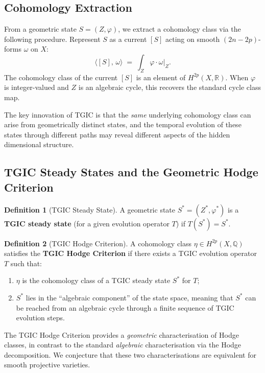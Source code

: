 \documentclass[11pt,a4paper]{article}
\theoremstyle{definition}
\newtheorem{definition}{Definition}[section]
\theoremstyle{plain}
\newcommand{\QQ}{\mathbb{Q}}
\newcommand{\RR}{\mathbb{R}}
\begin{document}
\subsection{Cohomology Extraction}

From a geometric state $S = (Z, \varphi)$, we extract a cohomology class via the following procedure. Represent $S$ as a current $[S]$ acting on smooth $(2n - 2p)$-forms $\omega$ on $X$:
\begin{equation}\label{eq:current}
\langle [S],\, \omega \rangle \;=\; \int_{Z} \varphi \cdot \omega|_{Z}.
\end{equation}
The cohomology class of the current $[S]$ is an element of $H^{2p}(X, \RR)$. When $\varphi$ is integer-valued and $Z$ is an algebraic cycle, this recovers the standard cycle class map.

The key innovation of TGIC is that the \emph{same} underlying cohomology class can arise from geometrically distinct states, and the temporal evolution of these states through different paths may reveal different aspects of the hidden dimensional structure.

\subsection{TGIC Steady States and the Geometric Hodge Criterion}

\begin{definition}[TGIC Steady State]\label{def:steady}
A geometric state $S^* = (Z^*, \varphi^*)$ is a \textbf{TGIC steady state} (for a given evolution operator $T$) if $T(S^*) = S^*$.
\end{definition}

\begin{definition}[TGIC Hodge Criterion]\label{def:hodge-criterion}
A cohomology class $\eta \in H^{2p}(X, \QQ)$ satisfies the \textbf{TGIC Hodge Criterion} if there exists a TGIC evolution operator $T$ such that:
\begin{enumerate}[nosep]
\item $\eta$ is the cohomology class of a TGIC steady state $S^*$ for $T$;
\item $S^*$ lies in the ``algebraic component'' of the state space, meaning that $S^*$ can be reached from an algebraic cycle through a finite sequence of TGIC evolution steps.
\end{enumerate}
\end{definition}

The TGIC Hodge Criterion provides a \emph{geometric} characterisation of Hodge classes, in contrast to the standard \emph{algebraic} characterisation via the Hodge decomposition. We conjecture that these two characterisations are equivalent for smooth projective varieties.
\end{document}
